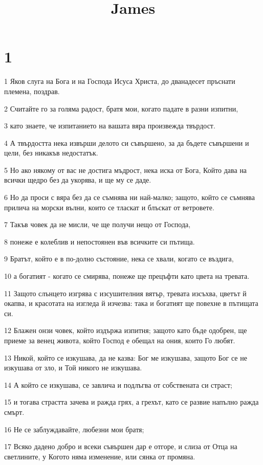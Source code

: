 

\title{James}


\chapter{1}

\par 1 Яков слуга на Бога и на Господа Исуса Христа, до дванадесет пръснати племена, поздрав.
\par 2 Считайте го за голяма радост, братя мои, когато падате в разни изпитни,
\par 3 като знаете, че изпитанието на вашата вяра произвежда твърдост.
\par 4 А твърдостта нека извърши делото си съвършено, за да бъдете съвършени и цели, без никакъв недостатък.
\par 5 Но ако някому от вас не достига мъдрост, нека иска от Бога, Който дава на всички щедро без да укорява, и ще му се даде.
\par 6 Но да проси с вяра без да се съмнява ни най-малко; защото, който се съмнява прилича на морски вълни, които се тласкат и блъскат от ветровете.
\par 7 Такъв човек да не мисли, че ще получи нещо от Господа,
\par 8 понеже е колеблив и непостоянен във всичките си пътища.
\par 9 Братът, който е в по-долно състояние, нека се хвали, когато се въздига,
\par 10 а богатият - когато се смирява, понеже ще прецъфти като цвета на тревата.
\par 11 Защото слънцето изгрява с изсушителния вятър, тревата изсъхва, цветът й окапва, и красотата на изгледа й изчезва: така и богатият ще повехне в пътищата си.
\par 12 Блажен онзи човек, който издържа изпитня; защото като бъде одобрен, ще приеме за венец живота, който Господ е обещал на ония, които Го любят.
\par 13 Никой, който се изкушава, да не казва: Бог ме изкушава, защото Бог се не изкушава от зло, и Той никого не изкушава.
\par 14 А който се изкушава, се завлича и подлъгва от собствената си страст;
\par 15 и тогава страстта зачева и ражда грях, а грехът, като се развие напълно ражда смърт.
\par 16 Не се заблуждавайте, любезни мои братя;
\par 17 Всяко дадено добро и всеки съвършен дар е отгоре, и слиза от Отца на светлините, у Когото няма изменение, или сянка от промяна.
